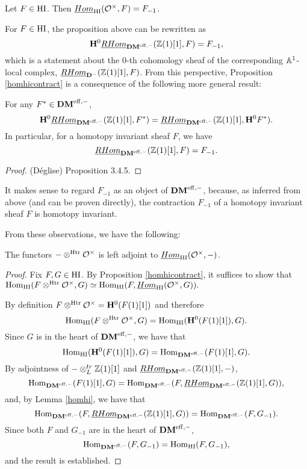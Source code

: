 \begin{prop}\label{homhicontract}
Let $F \in \HI$. Then $\ihomHI(\Ox, F) = F_{-1}$.
\end{prop}

For $F \in \HI$, the proposition above can be rewritten as 
\[
\H^0\rhomDM(\Z(1)[1], F) = F_{-1},
\] 
which is a statement about the 0-th cohomology sheaf 
of the corresponding $\A$-local complex, $\rhom(\Z(1)[1], F)$.
From this perspective, Proposition \ref{homhicontract} is a
consequence of the following more general result:

\begin{lem}\label{homhi}
For any $F^* \in \DMm$,
\[
\H^0\rhomDM(\Z(1)[1], F^*) = \rhomDM(\Z(1)[1],  \H^0F^*).
\]
In particular, for a homotopy invariant sheaf $F$, 
we have 
\[
\rhomDM(\Z(1)[1], F) = F_{-1}.
\]
\end{lem}

\begin{proof}
(D\'eglise) \cite{Deg08b} Proposition 3.4.5.
\end{proof}


\begin{rmk}
It makes sense to regard $F_{-1}$ as an object of $\DMm$,
because, as inferred from above (and can be proven directly),
the contraction $F_{-1}$ of a homotopy invariant sheaf $F$ is 
homotopy invariant. 
\end{rmk}

From these observations, we have the following:

\begin{cor}\label{hiadj}
The functors $ - \tHI \Ox$ is left adjoint to $\ihomHI(\Ox, -)$.
\end{cor}
\begin{proof}
Fix $F, G \in \HI$. By Proposition \ref{homhicontract}, it 
suffices to show that $\homHI(F \tHI \Ox, G) \simeq \homHI(F, 
\ihomHI(\Ox, G)).$ 

By definition $F \tHI \Ox = \H^0(F(1)[1])$ and therefore
\[
\homHI(F \tHI \Ox, G) = \homHI(\H^0(F(1)[1]), G).
\]
Since $G$ is in the heart of $\DMm$, we have that
\[
\homHI(\H^0(F(1)[1]), G) = \homDM(F(1)[1], G).
\]
By adjointness of $-\tDM \Z(1)[1]$ and $\rhomDM(\Z(1)[1], -)$,
\[
\homDM(F(1)[1], G) = \homDM(F, \rhomDM(\Z(1)[1], G)),
\]
and, by Lemma \ref{homhi}, we have that
\[
\homDM(F, \rhomDM(\Z(1)[1], G)) = \homDM(F, G_{-1}).
\]
Since both $F$ and $G_{-1}$ are in the heart of $\DMm$,
\[
\homDM(F, G_{-1}) = \homHI(F, G_{-1}),
\]
and the result is established.
\end{proof}

